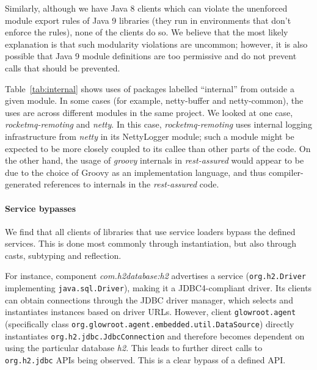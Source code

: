 Similarly, although we have Java 8 clients which can violate the unenforced module export rules of Java 9 libraries (they run in environments that don't enforce the rules), none of the clients do so. We believe that the most likely explanation is that such modularity violations are uncommon; however, it is also possible that Java 9 module definitions are too permissive and do not prevent calls that should be prevented.

Table~\ref{tab:internal} shows uses of packages labelled ``internal'' from outside
a given module. In some cases (for example, netty-buffer and netty-common),
the uses are across different modules in the same project. We looked
at one case, \emph{rocketmq-remoting} and \emph{netty}. In this case,
\emph{rocketmq-remoting} uses internal logging infrastructure from
\emph{netty} in its NettyLogger module; such a module might be
expected to be more closely coupled to its callee than other parts of
the code. On the other hand, the usage of \emph{groovy} internals in
\emph{rest-assured} would appear to be due to the choice of Groovy as
an implementation language, and thus compiler-generated references to
internals in the \emph{rest-assured} code.

%


\paragraph{Service bypasses}
We find that all clients of libraries that use service loaders bypass the defined services. This is done most commonly through instantiation, but also through casts, subtyping and reflection.

For instance, component \emph{com.h2database:h2} advertises a service (\texttt{org.h2.Driver} implementing \texttt{java.sql.Driver}), making it a JDBC4-compliant driver. Its clients can obtain connections through the JDBC driver manager, which selects and instantiates instances based on driver URLs. However, client \texttt{glowroot.agent} (specifically class \texttt{org.glowroot.\-agent.embedded.util.DataSource}) directly instantiates \texttt{org.h2.jdbc.JdbcConnection} and therefore becomes dependent on using the particular database \emph{h2}. This leads to further direct calls to \texttt{org.h2.jdbc} APIs being observed. This is a clear bypass of a defined API. 

